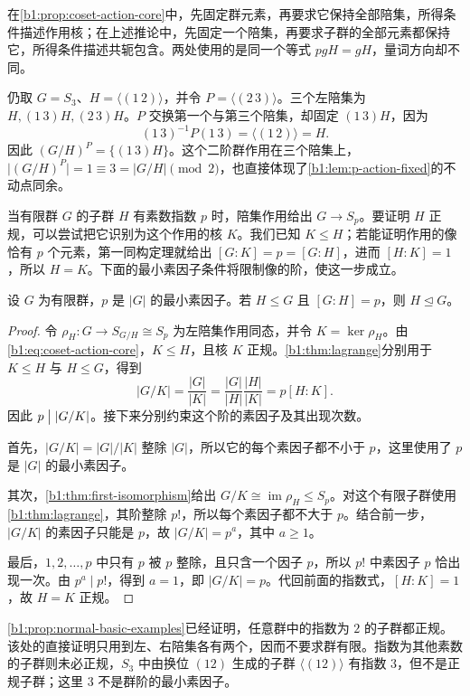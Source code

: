 在\cref{b1:prop:coset-action-core}中，先固定群元素，再要求它保持全部陪集，所得条件描述作用核；在上述推论中，先固定一个陪集，再要求子群的全部元素都保持它，所得条件描述共轭包含。两处使用的是同一个等式 \(pgH=gH\)，量词方向却不同。

\ProseParagraphBreak
仍取 \(G=S_3\)、\(H=\bigl\langle(1\,2)\bigr\rangle\)，并令 \(P=\bigl\langle(2\,3)\bigr\rangle\)。三个左陪集为 \(H,(1\,3)H,(2\,3)H\)。\(P\) 交换第一个与第三个陪集，却固定 \((1\,3)H\)，因为
\[
	(1\,3)^{-1}P(1\,3)=\bigl\langle(1\,2)\bigr\rangle=H.
\]
因此 \((G/H)^P=\{(1\,3)H\}\)。这个二阶群作用在三个陪集上，\(\lvert(G/H)^P\rvert=1\equiv3=\lvert G/H\rvert\pmod2\)，也直接体现了\cref{b1:lem:p-action-fixed}的不动点同余。

\ProseParagraphBreak
当有限群 \(G\) 的子群 \(H\) 有素数指数 \(p\) 时，陪集作用给出 \(G\rightarrow S_p\)。要证明 \(H\) 正规，可以尝试把它识别为这个作用的核 \(K\)。我们已知 \(K\leq H\)；若能证明作用的像恰有 \(p\) 个元素，第一同构定理就给出 \([G:K]=p=[G:H]\)，进而 \([H:K]=1\)，所以 \(H=K\)。下面的最小素因子条件将限制像的阶，使这一步成立。

\begin{theorem}\label{b1:thm:least-prime-index-normal}
	设 \(G\) 为有限群，\(p\) 是 \(|G|\) 的最小素因子。若 \(H\leq G\) 且 \([G:H]=p\)，则 \(H\trianglelefteq G\)。
\end{theorem}
\begin{proof}
	令 \(\rho_H:G\rightarrow S_{G/H}\cong S_p\) 为左陪集作用同态，并令 \(K=\ker\rho_H\)。由\eqref{b1:eq:coset-action-core}，\(K\leq H\)，且核 \(K\) 正规。\cref{b1:thm:lagrange}分别用于 \(K\leq H\) 与 \(H\leq G\)，得到
	\[
		|G/K|=\frac{|G|}{|K|} =\frac{|G|}{|H|}\frac{|H|}{|K|}=p[H:K].
	\]
	因此 \(p\bigm\vert|G/K|\)。接下来分别约束这个阶的素因子及其出现次数。

	首先，\(|G/K|=|G|/|K|\) 整除 \(|G|\)，所以它的每个素因子都不小于 \(p\)，这里使用了 \(p\) 是 \(|G|\) 的最小素因子。

	其次，\cref{b1:thm:first-isomorphism}给出 \(G/K\cong\operatorname{im}\rho_H\leq S_p\)。对这个有限子群使用\cref{b1:thm:lagrange}，其阶整除 \(p!\)，所以每个素因子都不大于 \(p\)。结合前一步，\(|G/K|\) 的素因子只能是 \(p\)，故 \(|G/K|=p^a\)，其中 \(a\geq1\)。

	最后，\(1,2,\ldots,p\) 中只有 \(p\) 被 \(p\) 整除，且只含一个因子 \(p\)，所以 \(p!\) 中素因子 \(p\) 恰出现一次。由 \(p^a\mid p!\)，得到 \(a=1\)，即 \(|G/K|=p\)。代回前面的指数式，\([H:K]=1\)，故 \(H=K\) 正规。
\end{proof}

\cref{b1:prop:normal-basic-examples}已经证明，任意群中的指数为 \(2\) 的子群都正规。该处的直接证明只用到左、右陪集各有两个，因而不要求群有限。指数为其他素数的子群则未必正规，\(S_3\) 中由换位 \((12)\) 生成的子群 \(\langle(12)\rangle\) 有指数 \(3\)，但不是正规子群；这里 \(3\) 不是群阶的最小素因子。

